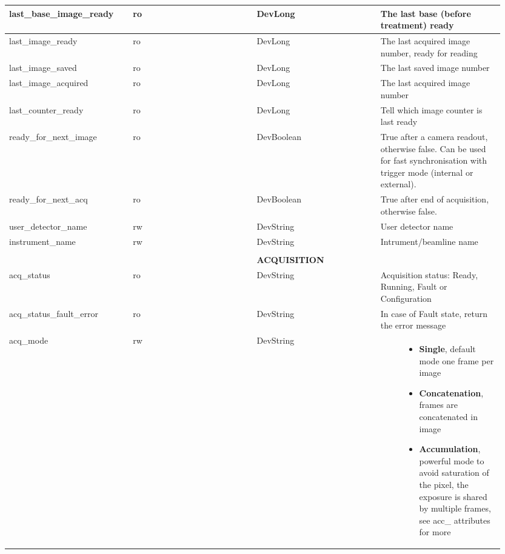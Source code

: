 \documentclass[letterpaper,10pt,english]{sphinxmanual}
\begin{document}
\begin{longtable}{|p{0.237\linewidth}|p{0.237\linewidth}|p{0.237\linewidth}|p{0.237\linewidth}|}
\\
\hline
last\_base\_image\_ready
 & 
ro
 & 
DevLong
 & 
The last base (before treatment) ready
\\
\hline
last\_image\_ready
 & 
ro
 & 
DevLong
 & 
The last acquired image number, ready for reading
\\
\hline
last\_image\_saved
 & 
ro
 & 
DevLong
 & 
The last saved image number
\\
\hline
last\_image\_acquired
 & 
ro
 & 
DevLong
 & 
The last acquired image number
\\
\hline
last\_counter\_ready
 & 
ro
 & 
DevLong
 & 
Tell which image counter is last ready
\\
\hline
ready\_for\_next\_image
 & 
ro
 & 
DevBoolean
 & 
True after a camera readout, otherwise false. Can be
used for fast synchronisation with trigger mode (internal
or external).
\\
\hline
ready\_for\_next\_acq
 & 
ro
 & 
DevBoolean
 & 
True after end of acquisition, otherwise false.
\\
\hline
user\_detector\_name
 & 
rw
 & 
DevString
 & 
User detector name
\\
\hline
instrument\_name
 & 
rw
 & 
DevString
 & 
Intrument/beamline name
\\
\hline

 & 

 & 

 & 

\\
\hline

 & 

 & 
\textbf{ACQUISITION}
 & 

\\
\hline
acq\_status
 & 
ro
 & 
DevString
 & 
Acquisition status: Ready, Running, Fault or Configuration
\\
\hline
acq\_status\_fault\_error
 & 
ro
 & 
DevString
 & 
In case of Fault state, return the error message
\\
\hline
acq\_mode
 & 
rw
 & 
DevString
 & \begin{description}
\item[{Acquisition mode:}] \leavevmode\begin{itemize}
\item {} 
\textbf{Single}, default mode one frame per image

\item {} 
\textbf{Concatenation}, frames are concatenated in image

\item {} 
\textbf{Accumulation}, powerful mode to avoid saturation
of the pixel, the exposure is shared
by multiple frames, see acc\_ attributes for more


\end{itemize}
\end{description}
\end{longtable}
\end{document}
